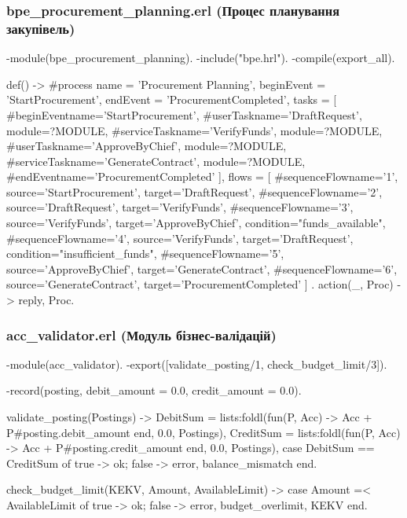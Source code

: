 \documentclass{article}
\let\originalfootnotesize\footnotesize
\let\oldverbatim\verbatim
\let\oldendverbatim\endverbatim
\renewenvironment{verbatim}{\originalfootnotesize\oldverbatim}{\oldendverbatim}
\begin{document}
\subsubsection{bpe\_procurement\_planning.erl (Процес планування закупівель)}
\begin{verbatim}
-module(bpe_procurement_planning).
-include("bpe.hrl").
-compile(export_all).

def() ->
    #process{
        name = 'Procurement Planning',
        beginEvent = 'StartProcurement',
        endEvent = 'ProcurementCompleted',
        tasks = [
            #beginEvent{name='StartProcurement'},
            #userTask{name='DraftRequest', module=?MODULE},
            #serviceTask{name='VerifyFunds', module=?MODULE},
            #userTask{name='ApproveByChief', module=?MODULE},
            #serviceTask{name='GenerateContract', module=?MODULE},
            #endEvent{name='ProcurementCompleted'}
        ],
        flows = [
            #sequenceFlow{name='1', source='StartProcurement', 
                         target='DraftRequest'},
            #sequenceFlow{name='2', source='DraftRequest', 
                         target='VerifyFunds'},
            #sequenceFlow{name='3', source='VerifyFunds', 
                         target='ApproveByChief', condition="funds_available"},
            #sequenceFlow{name='4', source='VerifyFunds', 
                         target='DraftRequest', condition="insufficient_funds"},
            #sequenceFlow{name='5', source='ApproveByChief', 
                         target='GenerateContract'},
            #sequenceFlow{name='6', source='GenerateContract', 
                         target='ProcurementCompleted'}
        ]
    }.
action(_, Proc) -> {reply, Proc}.
\end{verbatim}

\subsubsection{acc\_validator.erl (Модуль бізнес-валідацій)}
\begin{verbatim}
-module(acc_validator).
-export([validate_posting/1, check_budget_limit/3]).

-record(posting, {debit_amount = 0.0, credit_amount = 0.0}).

validate_posting(Postings) ->
    DebitSum = lists:foldl(fun(P, Acc) -> Acc + P#posting.debit_amount end, 0.0, Postings),
    CreditSum = lists:foldl(fun(P, Acc) -> Acc + P#posting.credit_amount end, 0.0, Postings),
    case DebitSum == CreditSum of
        true -> ok;
        false -> {error, balance_mismatch}
    end.

check_budget_limit(KEKV, Amount, AvailableLimit) ->
    case Amount =< AvailableLimit of
        true -> ok;
        false -> {error, {budget_overlimit, KEKV}}
    end.
\end{verbatim}
\end{document}
